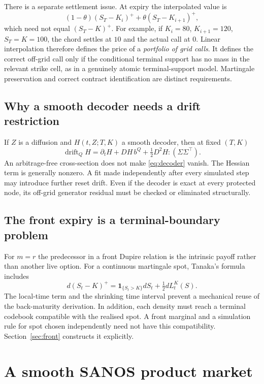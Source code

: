 \documentclass[11pt,a4paper]{article}
\numberwithin{equation}{section}
\theoremstyle{definition}\newtheorem{definition}[theorem]{Definition}
\theoremstyle{remark}\newtheorem{remark}[theorem]{Remark}
\newcommand{\ind}{\mathbf 1}\newcommand{\diag}{\operatorname{diag}}
\begin{document}
There is a separate settlement issue. At expiry the interpolated value is
\[
 (1-\theta)(S_T-K_i)^++\theta(S_T-K_{i+1})^+,
\]
which need not equal $(S_T-K)^+$. For example, if $K_i=80$, $K_{i+1}=120$, $S_T=K=100$, the chord settles at $10$ and the actual call at $0$. Linear interpolation therefore defines the price of a \emph{portfolio of grid calls}. It defines the correct off-grid call only if the conditional terminal support has no mass in the relevant strike cell, as in a genuinely atomic terminal-support model. Martingale preservation and correct contract identification are distinct requirements.

\subsection{Why a smooth decoder needs a drift restriction}
If $Z$ is a diffusion and $H(t,Z;T,K)$ a smooth decoder, then at fixed $(T,K)$
\begin{equation}
 \operatorname{drift}_Q H
 =\partial_tH+D H\,b^Q+\tfrac12D^2H:(\Sigma\Sigma^\top).
 \label{eq:decoder}
\end{equation}
An arbitrage-free cross-section does not make \eqref{eq:decoder} vanish. The Hessian term is generally nonzero. A fit made independently after every simulated step may introduce further reset drift. Even if the decoder is exact at every protected node, its off-grid generator residual must be checked or eliminated structurally.

\subsection{The front expiry is a terminal-boundary problem}
For $m=r$ the predecessor in a front Dupire relation is the intrinsic payoff rather than another live option. For a continuous martingale spot, Tanaka's formula includes
\[
 d(S_t-K)^+=\ind_{\{S_t>K\}}dS_t+\tfrac12dL_t^K(S).
\]
The local-time term and the shrinking time interval prevent a mechanical reuse of the back-maturity derivation. In addition, each density must reach a terminal codebook compatible with the realised spot. A front marginal and a simulation rule for spot chosen independently need not have this compatibility. Section~\ref{sec:front} constructs it explicitly.

\section{A smooth SANOS product market}
\label{sec:product}
\end{document}
